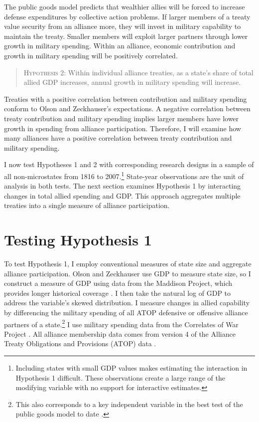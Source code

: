 \documentclass[12pt]{article}
\begin{document}
The public goods model predicts that wealthier allies will be forced to increase defense expenditures by collective action problems.  
If larger members of a treaty value security from an alliance more, they will invest in military capability to maintain the treaty.
Smaller members will exploit larger partners through lower growth in military spending. 
Within an alliance, economic contribution and growth in military spending will be positively correlated. 


\begin{quote}
\textsc{Hypothesis 2}: Within individual alliance treaties, as a state's share of total allied GDP increases, annual growth in military spending will increase. 
\end{quote}


Treaties with a positive correlation between contribution and military spending conform to Olson and Zeckhauser's expectations. 
A negative correlation between treaty contribution and military spending implies larger members have lower growth in spending from alliance participation. 
Therefore, I will examine how many alliances have a positive correlation between treaty contribution and military spending.  


I now test Hypotheses 1 and 2 with corresponding research designs in a sample of all non-microstates from 1816 to 2007.\footnote{Including states with small GDP values makes estimating the interaction in Hypothesis 1 difficult. These observations create a large range of the modifying variable with no support for interactive estimates.}
State-year observations are the unit of analysis in both tests.  
The next section examines Hypothesis 1 by interacting changes in total allied spending and GDP.
This approach aggregates multiple treaties into a single measure of alliance participation. 


\section{Testing Hypothesis 1}


To test Hypothesis 1, I employ conventional measures of state size and aggregate alliance participation. 
Olson and Zeckhauser use GDP to measure state size, so I construct a measure of GDP using data from the Maddison Project, which provides longer historical coverage \citep{Boltetal2018}. 
I then take the natural log of GDP to address the variable's skewed distribution. 
I measure changes in allied capability by differencing the military spending of all ATOP defensive or offensive alliance partners of a state.\footnote{This also corresponds to a key independent variable in the best test of the public goods model to date \citep{PluemperNeumayer2015}.}
I use military spending data from the Correlates of War Project \citep{SingerCINC1988}.  
All alliance membership data comes from version 4 of the Alliance Treaty Obligations and Provisions (ATOP) data \citep{Leedsetal2002}.  
\end{document}
